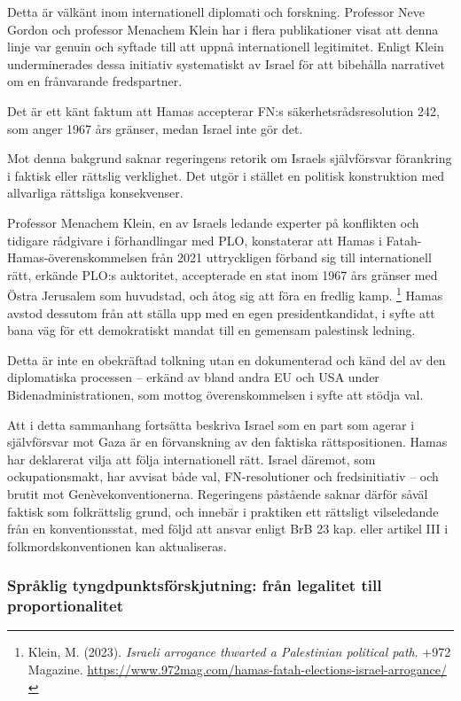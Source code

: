 Detta är välkänt inom internationell diplomati och forskning. Professor Neve Gordon och professor Menachem Klein 
har i flera publikationer visat att denna linje var genuin och syftade till att uppnå internationell legitimitet. 
Enligt Klein underminerades dessa initiativ systematiskt av Israel för att bibehålla narrativet om en frånvarande fredspartner.

Det är ett känt faktum att Hamas accepterar FN:s säkerhetsrådsresolution 242, som anger 1967 års gränser, medan Israel inte gör det.

Mot denna bakgrund saknar regeringens retorik om Israels självförsvar förankring i faktisk eller rättslig verklighet. 
Det utgör i stället en politisk konstruktion med allvarliga rättsliga konsekvenser.

Professor Menachem Klein, en av Israels ledande experter på konflikten och tidigare rådgivare i förhandlingar med PLO, 
konstaterar att Hamas i Fatah-Hamas-överenskommelsen från 2021 uttryckligen förband sig till internationell rätt, 
erkände PLO:s auktoritet, accepterade en stat inom 1967 års gränser med Östra Jerusalem som huvudstad, 
och åtog sig att föra en fredlig kamp.%
\footnote{Klein, M. (2023). \textit{Israeli arrogance thwarted a Palestinian political path}. +972 Magazine. \url{https://www.972mag.com/hamas-fatah-elections-israel-arrogance/}} 
Hamas avstod dessutom från att ställa upp med en egen presidentkandidat, i syfte att bana väg för ett demokratiskt mandat 
till en gemensam palestinsk ledning.

Detta är inte en obekräftad tolkning utan en dokumenterad och känd del av den diplomatiska processen – erkänd av 
bland andra EU och USA under Bidenadministrationen, som mottog överenskommelsen i syfte att stödja val.

Att i detta sammanhang fortsätta beskriva Israel som en part som agerar i självförsvar mot Gaza är en förvanskning 
av den faktiska rättspositionen. Hamas har deklarerat vilja att följa internationell rätt. Israel däremot, som ockupationsmakt, 
har avvisat både val, FN-resolutioner och fredsinitiativ – och brutit mot Genèvekonventionerna. 
Regeringens påstående saknar därför såväl faktisk som folkrättslig grund, och innebär i praktiken ett rättsligt vilseledande 
från en konventionsstat, med följd att ansvar enligt BrB 23 kap. eller artikel III i folkmordskonventionen 
kan aktualiseras.

\medskip

\subsubsection{Språklig tyngdpunktsförskjutning: från legalitet till proportionalitet}


